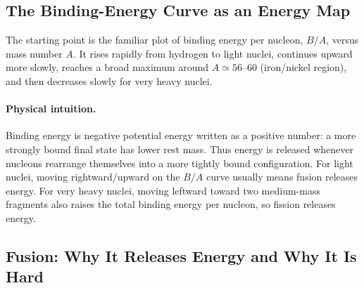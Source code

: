 \subsection{The Binding-Energy Curve as an Energy Map}
\label{subsec:lec11:binding_curve_energy}

The starting point is the familiar plot of binding energy per nucleon,
$B/A$, versus mass number $A$. It rises rapidly from hydrogen to light nuclei,
continues upward more slowly, reaches a broad maximum around
$A\simeq 56$--$60$ (iron/nickel region), and then decreases slowly for very
heavy nuclei.


\paragraph{Physical intuition.}
Binding energy is negative potential energy written as a positive number: a more
strongly bound final state has lower rest mass. Thus energy is released whenever
nucleons rearrange themselves into a more tightly bound configuration. For light
nuclei, moving rightward/upward on the $B/A$ curve usually means fusion releases
energy. For very heavy nuclei, moving leftward toward two medium-mass fragments
also raises the total binding energy per nucleon, so fission releases energy.


\subsection{Fusion: Why It Releases Energy and Why It Is Hard}
\label{subsec:lec11:fusion_basics}

